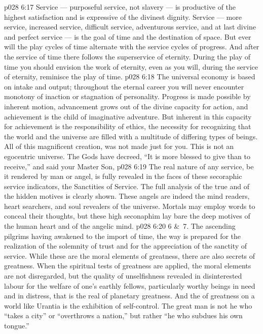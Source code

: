 \vs p028 6:17 Service --- purposeful service, not slavery --- is productive of the highest satisfaction and is expressive of the divinest dignity. Service --- more service, increased service, difficult service, adventurous service, and at last divine and perfect service --- is the goal of time and the destination of space. But ever will the play cycles of time alternate with the service cycles of progress. And after the service of time there follows the superservice of eternity. During the play of time you should envision the work of eternity, even as you will, during the service of eternity, reminisce the play of time.
\vs p028 6:18 \pc The universal economy is based on intake and output; throughout the eternal career you will never encounter monotony of inaction or stagnation of personality. Progress is made possible by inherent motion, advancement grows out of the divine capacity for action, and achievement is the child of imaginative adventure. But inherent in this capacity for achievement is the responsibility of ethics, the necessity for recognizing that the world and the universe are filled with a multitude of differing types of beings. All of this magnificent creation,  was not made just for you. This is not an egocentric universe. The Gods have decreed, “It is more blessed to give than to receive,” and said your Master Son, 
\vs p028 6:19 \pc The real nature of any service, be it rendered by man or angel, is fully revealed in the faces of these secoraphic service indicators, the Sanctities of Service. The full analysis of the true and of the hidden motives is clearly shown. These angels are indeed the mind readers, heart searchers, and soul revealers of the universe. Mortals may employ words to conceal their thoughts, but these high seconaphim lay bare the deep motives of the human heart and of the angelic mind.
\vs p028 6:20 6 \&\ 7.  The ascending pilgrims having awakened to the import of time, the way is prepared for the realization of the solemnity of trust and for the appreciation of the sanctity of service. While these are the moral elements of greatness, there are also secrets of greatness. When the spiritual tests of greatness are applied, the moral elements are not disregarded, but the quality of unselfishness revealed in disinterested labour for the welfare of one’s earthly fellows, particularly worthy beings in need and in distress, that is the real  of planetary greatness. And the  of greatness on a world like Urantia is the exhibition of self\hyp{}control. The great man is not he who “takes a city” or “overthrows a nation,” but rather “he who subdues his own tongue.”
